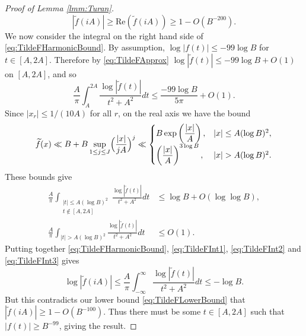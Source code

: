 \documentclass[12pt]{amsart}
\theoremstyle{plain}
\theoremstyle{definition}
\theoremstyle{remark}
\begin{document}
\begin{proof}[Proof of Lemma \ref{lmm:Turan}]
%
\begin{equation}
|\widetilde{f}(i A)|\ge \text{Re}(\widetilde{f}(i A))\ge 1-O(B^{-200}).
\label{eq:TildeFLowerBound}
\end{equation}
%
We now consider the integral on the right hand side of \eqref{eq:TildeFHarmonicBound}. By assumption, $\log|f(t)|\le -99\log{B}$ for $t\in[A,2A]$. Therefore by \eqref{eq:TildeFApprox} $\log|\widetilde{f}(t)|\le -99\log{B}+O(1)$ on $[A,2A]$, and so
%
\begin{equation}
\frac{A}{\pi}\int_{A}^{2A}\frac{\log{|\widetilde{f}(t)|}}{t^2+A^2}dt\le \frac{-99\log{B}}{5\pi}+O(1).\label{eq:TildeFInt1}
\end{equation}
%
Since $|x_r|\le 1/(10A)$ for all $r$, on the real axis we have the bound
%
\begin{equation}
\widetilde{f}(x)\ll B+B\sup_{1\le j\le J}\Bigl(\frac{|x|}{j A}\Bigr)^j\ll 
\begin{cases}
B\exp\left(\displaystyle\frac{|x|}{A}\right),& |x|\le A(\log{B})^2,\\
\left(\displaystyle\frac{|x|}{A}\right)^{3\log{B}},&|x|>A(\log{B})^2.
\end{cases}
\label{eq:TildeFUpperBound}
\end{equation}
%
These bounds give
%
\begin{align}
\frac{A}{\pi}\int_{\substack{|t|\le A(\log{B})^2\\ t\notin [A,2A]}}\frac{\log{|\widetilde{f}(t)|}}{t^2+A^2}dt&\le \log{B}+O(\log\log{B}),\label{eq:TildeFInt2}\\
\frac{A}{\pi}\int_{|t|>A(\log{B})^2}\frac{\log{|\widetilde{f}(t)|}}{t^2+A^2}dt&\le O(1).\label{eq:TildeFInt3}
\end{align}
%
Putting together \eqref{eq:TildeFHarmonicBound}, \eqref{eq:TildeFInt1}, \eqref{eq:TildeFInt2} and \eqref{eq:TildeFInt3} gives
\[
\log|\widetilde{f}(i A)|\le\frac{A}{\pi}\int_{-\infty}^{\infty}\frac{\log{|\widetilde{f}(t)|}}{t^2+A^2}dt\le -\log{B}.
\] 
But this contradicts our lower bound \eqref{eq:TildeFLowerBound} that $|\widetilde{f}(i A)|\ge 1-O(B^{-100})$. Thus there must be some $t\in [A,2A]$ such that $|f(t)|\ge B^{-99}$, giving the result.
\end{proof}
%
%
%
%
\end{document}
